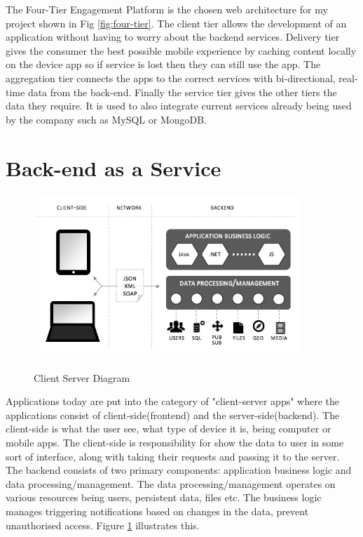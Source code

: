 The Four-Tier Engagement Platform is the chosen web architecture for my project shown in Fig \ref{fig:four-tier}. The client tier allows the development of an application without having to worry about the backend services. Delivery tier gives the consumer the best possible mobile experience by caching content locally on the device app so if service is lost then they can still use the app. The aggregation tier connects the apps to the correct services with bi-directional, real-time data from the back-end. Finally the service tier gives the other tiers the data they require. It is used to also integrate current services already being used by the company such as MySQL or MongoDB. 

\section{Back-end as a Service}

\begin{figure}[!h]
    \caption{Client Server Diagram}
    \centering
    \includegraphics[width=100mm]{images/client-server-diagram}
    \label{fig:client-server}
\end{figure}

Applications today are put into the category of "client-server apps" where the applications consist of client-side(frontend) and the server-side(backend). The client-side is what the user see, what type of device it is, being computer or mobile apps. The client-side is responsibility for show the data to user in some sort of interface, along with taking their requests and passing it to the server. 
The backend consists of two primary components: application business logic and data processing/management. The data processing/management operates on various resources being users, persistent data, files etc. The business logic manages triggering notifications based on changes in the data, prevent unauthorised access.  Figure \ref{fig:client-server} illustrates this.

